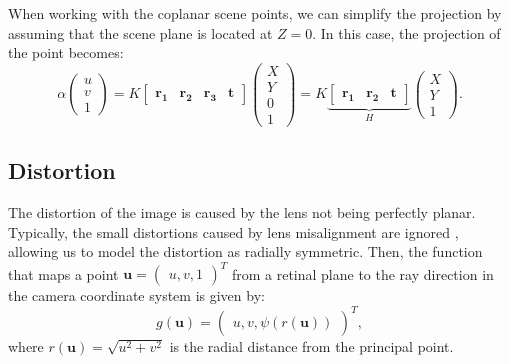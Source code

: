 When working with the coplanar scene points, we can simplify the projection
by assuming that the scene plane is located at \(Z = 0\). In this case, the
projection of the point becomes:
\begin{equation}
	\alpha \begin{pmatrix}
		u \\ v \\ 1
	\end{pmatrix} = K \begin{bmatrix}
		\mathbf{r_1} & \mathbf{r_2} & \mathbf{r_3} & \mathbf{t}
	\end{bmatrix} \begin{pmatrix}
		X \\ Y \\ 0 \\ 1
	\end{pmatrix} = K \underbrace{\begin{bmatrix}
			\mathbf{r_1} & \mathbf{r_2} & \mathbf{t}
		\end{bmatrix}}_{H} \begin{pmatrix}
		X \\ Y \\ 1
	\end{pmatrix}.
\end{equation}

\subsection{Distortion}\label{sub:distortion}

The distortion of the image is caused by the lens not being perfectly planar.
Typically, the small distortions caused by lens misalignment are ignored
\cite{hartleyMultipleViewGeometry2004}, allowing us to model the distortion as radially symmetric.
Then, the function that maps a point \(\mathbf{u} = \begin{pmatrix}
	u, v, 1
\end{pmatrix}^{T}\) from a retinal plane to the
ray direction in the camera coordinate system is given by:
\begin{equation}
	g(\mathbf{u}) = \begin{pmatrix}
		u, v, \psi(r(\mathbf{u}))
	\end{pmatrix}^{T},
\end{equation}
where \(r(\mathbf{u}) = \sqrt{u^2 + v^2}\) is the radial distance from the
principal point.

